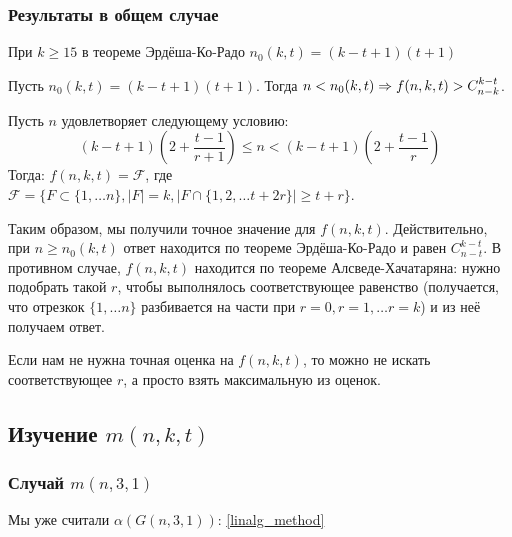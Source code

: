 \subsubsection{Результаты в общем случае}
\begin{theorem}[б/д, 1979, Франкл]
    При \(k \ge 15\) в теореме Эрдёша-Ко-Радо \(n_0(k, t) = (k - t + 1)(t + 1)\)
\end{theorem}

\begin{theorem}[б/д, 1983, Уилсон]
    Пусть \(n_0(k, t) = (k - t + 1)(t + 1)\). Тогда \(n < n_0(k, t) \Rightarrow f(n, k, t) > C_{n - k}^{k - t}\).
\end{theorem}

\begin{theorem}
    Пусть \(n\) удовлетворяет следующему условию:
    \[(k - t + 1)\left( 2 + \frac{t - 1}{r + 1} \right) \le n < (k - t + 1)\left( 2 + \frac{t - 1}{r} \right)\]
    Тогда: \(f(n, k, t) = \mathcal{F}\), где \(\mathcal{F} = \{F \subset \{1, \dots n\}, |F| = k, |F \cap \{1, 2, \dots t + 2r\}| \ge t + r\}\).
\end{theorem}

\begin{note}
    Таким образом, мы получили точное значение для \(f(n, k, t)\). Действительно, при \(n \ge n_0(k, t)\) ответ находится по теореме Эрдёша-Ко-Радо и равен \(C_{n - t}^{k - t}\). В противном случае, \(f(n, k, t)\) находится по теореме Алсведе-Хачатаряна: нужно подобрать такой \(r\), чтобы выполнялось соответствующее равенство (получается, что отрезкок \(\{1, \dots n\}\) разбивается на части при \(r = 0, r = 1, \dots r = k\)) и из неё получаем ответ.
\end{note}

\begin{note}
    Если нам не нужна точная оценка на \(f(n, k, t)\), то можно не искать соответствующее \(r\), а просто взять максимальную из оценок.
\end{note}

\subsection{Изучение \(m(n, k, t)\)}
\subsubsection{Случай \(m(n, 3, 1)\)}
\begin{reminder}
    Мы уже считали \(\alpha(G(n, 3, 1))\): \ref{linalg_method}
\end{reminder}

